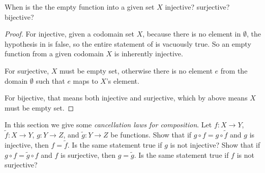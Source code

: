 \begin{exercise} \label{exercise 3.3.3}
When is the the empty function into a given set \(X\) injective? surjective? bijective?
\end{exercise}

\begin{proof}
For injective, given a codomain set \(X\), because there is no element in \(\emptyset\), the hypothesis in  is false, so the entire statement of  is vacuously true.
So an empty function from a given codomain \(X\) is inherently injective.

For surjective, \(X\) must be empty set, otherwise there is no element \(e\) from the domain \(\emptyset\) such that \(e\) maps to \(X\)'s element.

For bijective, that means both injective and surjective, which by above means \(X\) must be empty set.
\end{proof}

\begin{exercise} \label{exercise 3.3.4}
In this section we give some \emph{cancellation laws for composition}.
Let \(f : X \rightarrow Y\), \(\tilde{f} : X \rightarrow Y\), \(g : Y \rightarrow Z\), and \(\tilde{g} : Y \rightarrow Z\) be functions.
Show that if \(g \circ f = g \circ \tilde{f}\) and \(g\) is injective, then \(f = \tilde{f}\).
Is the same statement true if \(g\) is not injective?
Show that if \(g \circ f = \tilde{g} \circ f\) and \(f\) is surjective, then \(g = \tilde{g}\).
Is the same statement true if \(f\) is not surjective?
\end{exercise}

